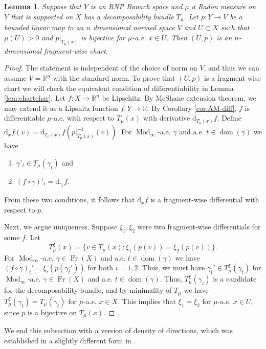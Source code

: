 \documentclass{amsart}
\newtheorem{lemma}[theorem]{Lemma}
\numberwithin{equation}{section}
\newcommand{\R}{\mathbb{R}}
\newcommand{\Mod}{\operatorname{Mod}}
\newcommand{\dom}{\operatorname{dom}}
\newcommand{\Fr}{\operatorname{Fr}}
\newcommand{\ud}{\mathrm {d}}
\begin{document}
\begin{lemma}\label{lem:proj-are-charts}
Suppose that $Y$ is an RNP Banach space and  $\mu$ a Radon measure on $Y$ that is supported on $X$ has a decomposability bundle $T_\mu$. Let $p:Y\to V$ be a bounded linear map to an $n$ dimensional normed space $V$ and $U\subset X$ such that $\mu(U)>0$ and $p|_{T_\mu(x)}$ is bijective for $\mu$-a.e. $x\in U$. Then $(U,p)$ is an $n$-dimensional fragment-wise chart.
\end{lemma}
\begin{proof}
The statement is independent of the choice of norm on $V$, and thus we can assume $V=\R^n$ with the standard norm. To prove that $(U,p)$ is a fragment-wise chart we will check the equivalent condition of differentiability in Lemma \ref{lem:chartchar}. Let $f:X\to \R^n$ be Lipschitz. By McShane extension theorem, we may extend it as a Lipshitz function $f:Y\to \R$. By Corollary \ref{cor:AM-diff}, $f$ is differentiable $\mu$-a.e. with respect to $T_\mu(x)$ with derivative $\ud_{T_{\mu}(x)}f$. Define $\ud_x f(v)=\ud_{T_{\mu}(x)}f(p|_{T_{\mu}(x)}^{-1}(v))$. For $\Mod_\infty$-a.e. $\gamma$ and a.e. $t\in \dom(\gamma)$ we have 
\begin{enumerate}
    \item $\gamma'_t\in T_\mu(\gamma_t)$ and
    \item $(f\circ \gamma)'_t = \ud_{\gamma_t}f$.
\end{enumerate}
From these two conditions, it follows that $\ud_x f$ is a fragment-wise differential with respect to $p$.

Next, we argue uniqueness. Suppose $\xi_1,\xi_2$ were two fragment-wise differentials for some $f$. Let
\[
T^\xi_\mu(x)=\{v\in T_\mu(x) : \xi_1(p(v))=\xi_2(p(v))\}.
\]
For $\Mod_\infty$-a.e. $\gamma\in \Fr(X)$ and a.e. $t\in \dom(\gamma)$ we have $(f\circ \gamma)_t' = \xi_i(p(\gamma_t'))$ for both $i=1,2$. Thus, we must have $\gamma_t'\in T^\xi_\mu(\gamma_t)$ for $\Mod_\infty$-a.e. $\gamma\in \Fr(X)$ and a.e. $t\in \dom(\gamma)$. Thus, $T^\xi_\mu(\gamma_t)$ is a candidate for the decomposability bundle, and by minimality of $T_\mu$ we have $T^\xi_\mu(\gamma_t)=T_\mu(\gamma_t)$ for $\mu$-a.e. $x\in X$. This implies that $\xi_1=\xi_2$ for $\mu$-a.e. $x\in U$, since $p$ is a bijective on $T_\mu(x)$.
\end{proof}

We end this subsection with a version of density of directions, which was established in a slightly different form in \cite[Theorem 6.4]{tsd24}.
\end{document}
